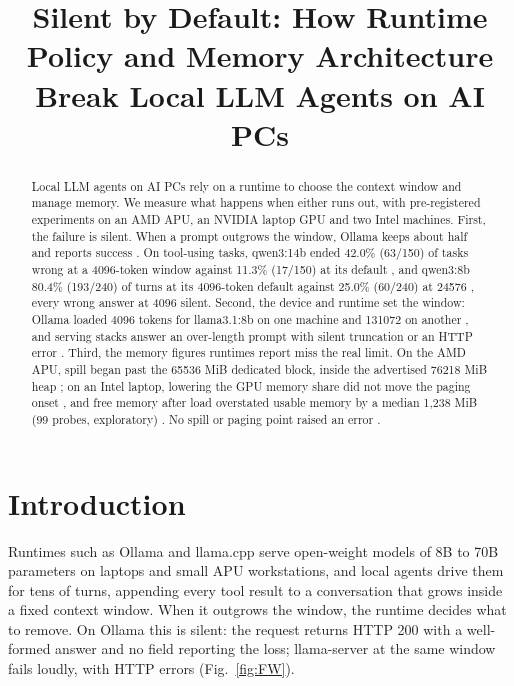 \documentclass[conference,10pt]{IEEEtran}
\begin{document}
\title{Silent by Default: How Runtime Policy and Memory Architecture Break Local LLM Agents on AI PCs}

\author{
}

\maketitle

\begin{abstract}
Local LLM agents on AI PCs rely on a runtime to choose the context window and manage memory. We measure what happens when either runs out, with pre-registered experiments on an AMD APU, an NVIDIA laptop GPU and two Intel machines. First, the failure is silent. When a prompt outgrows the window, Ollama keeps about half and reports success%
. On tool-using tasks, qwen3:14b ended 42.0\% (63/150) of tasks wrong at a 4096-token window against 11.3\% (17/150) at its default%
, and qwen3:8b 80.4\% (193/240) of turns at its 4096-token default against 25.0\% (60/240) at 24576%
, every wrong answer at 4096 silent. Second, the device and runtime set the window: Ollama loaded 4096 tokens for llama3.1:8b on one machine and 131072 on another%
, and serving stacks answer an over-length prompt with silent truncation or an HTTP error%
. Third, the memory figures runtimes report miss the real limit. On the AMD APU, spill began past the 65536 MiB dedicated block, inside the advertised 76218 MiB heap%
; on an Intel laptop, lowering the GPU memory share did not move the paging onset%
, and free memory after load overstated usable memory by a median 1,238 MiB (99 probes, exploratory)%
. No spill or paging point raised an error%
.
\end{abstract}

\section{Introduction}\label{sec:4.1}


Runtimes such as Ollama and llama.cpp serve open-weight models of 8B to 70B parameters on laptops and small APU workstations, and local agents drive them for tens of turns, appending every tool result to a conversation that grows inside a fixed context window. When it outgrows the window, the runtime decides what to remove. On Ollama this is silent: the request returns HTTP 200 %
with a well-formed answer and no field reporting the loss; llama-server at the same window fails loudly, with HTTP errors %
(Fig.~\ref{fig:FW}).
\end{document}
